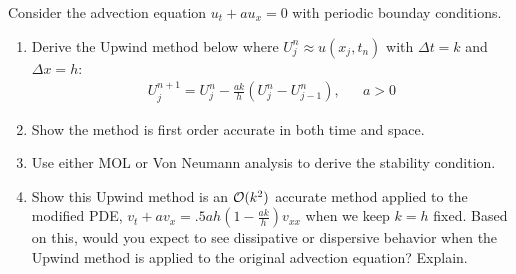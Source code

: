 \documentclass[10pt]{article}
\begin{document}
\begin{problem}
Consider the advection equation \( u_t + au_x = 0 \) with periodic bounday conditions.
\begin{enumerate}[label=(\alph*),nolistsep]
    \item Derive the Upwind method below where \( U_j^n \approx u(x_j,t_n) \) with \( \Delta t = k \) and \( \Delta x = h \):
        \begin{align*}
            U_j^{n+1} = U_j^n - \frac{ak}{h} (U_j^n - U_{j-1}^n), && a>0
        \end{align*}
    \item Show the method is first order accurate in both time and space.
	\item Use either MOL or Von Neumann analysis to derive the stability condition.
	\item Show this Upwind method is an \( \mathcal{O}(k^2) \) accurate method applied to the modified PDE, \( v_t + av_x = .5ah(1 - \frac{ak}{h} )v_{xx} \) when we keep \( k=h \) fixed. Based on this, would you expect to see dissipative or dispersive behavior when the Upwind method is applied to the original advection equation? Explain.
\end{enumerate}
\end{problem}
\end{document}
